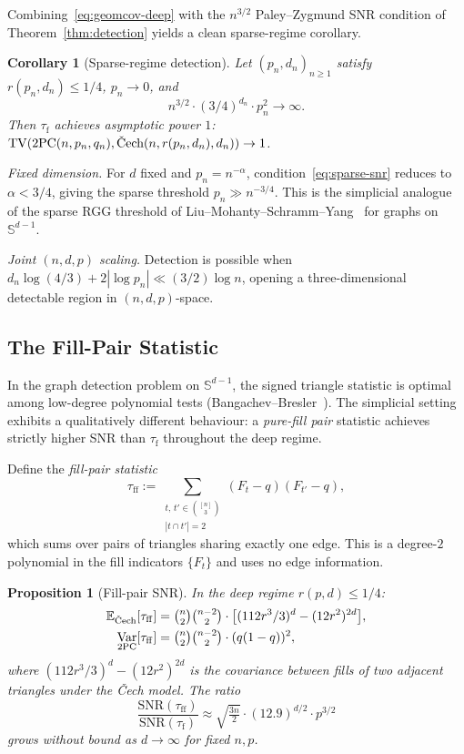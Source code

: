 \documentclass[reqno,12pt]{amsart}
\newcommand{\tauf}{\tau_{\mathrm{f}}}
\newcommand{\tauff}{\tau_{\mathrm{ff}}}
\newcommand{\PC}{\mathrm{2PC}}
\newcommand{\Cech}{\ifmmode\text{\v{C}ech}\else\v{C}ech\fi}  %
\newcommand{\TV}{\mathrm{TV}}
\newcommand{\Sph}{\mathbb{S}}
\newcommand{\EE}{\mathbb{E}}
\DeclareMathOperator{\Var}{Var}
\theoremstyle{plain}
\newtheorem{proposition}[theorem]{Proposition}
\newtheorem{corollary}[theorem]{Corollary}
\theoremstyle{definition}
\theoremstyle{remark}
\begin{document}
Combining~\eqref{eq:geomcov-deep} with the $n^{3/2}$ Paley--Zygmund SNR condition of
Theorem~\ref{thm:detection} yields a clean sparse-regime corollary.

\begin{corollary}[Sparse-regime detection]\label{cor:sparse}
Let $(p_n, d_n)_{n\geq 1}$ satisfy $r(p_n,d_n) \leq 1/4$, $p_n \to 0$, and
\begin{equation}\label{eq:sparse-snr}
  n^{3/2} \cdot (3/4)^{d_n} \cdot p_n^2 \to \infty.
\end{equation}
Then $\tauf$ achieves asymptotic power $1$: $\TV(\PC(n,p_n,q_n),\Cech(n,r(p_n,d_n),d_n))\to 1$.
\end{corollary}

\noindent
\emph{Fixed dimension.} For $d$ fixed and $p_n = n^{-\alpha}$, condition~\eqref{eq:sparse-snr}
reduces to $\alpha < 3/4$, giving the sparse threshold $p_n \gg n^{-3/4}$. This is the simplicial
analogue of the sparse RGG threshold of Liu--Mohanty--Schramm--Yang~\cite{Liu2022} for graphs on
$\Sph^{d-1}$.

\emph{Joint $(n,d,p)$ scaling.} Detection is possible when
$d_n\log(4/3) + 2|\!\log p_n| \ll (3/2)\log n$, opening a three-dimensional detectable region
in $(n,d,p)$-space.

\subsection{The Fill-Pair Statistic}\label{sec:fillfill}

In the graph detection problem on $\Sph^{d-1}$, the signed triangle statistic is optimal among
low-degree polynomial tests (Bangachev--Bresler~\cite{BangachevBresler2024}). The simplicial
setting exhibits a qualitatively different behaviour: a \emph{pure-fill pair} statistic achieves
strictly higher SNR than $\tauf$ throughout the deep regime.

Define the \emph{fill-pair statistic}
\[
  \tauff := \sum_{\substack{t,\, t' \in \binom{[n]}{3} \\ |t \cap t'| = 2}}
            (F_t - q)(F_{t'} - q),
\]
which sums over pairs of triangles sharing exactly one edge. This is a degree-$2$ polynomial
in the fill indicators $\{F_t\}$ and uses no edge information.

\begin{proposition}[Fill-pair SNR]\label{prop:fillfill}
In the deep regime $r(p,d) \leq 1/4$:
\begin{align}
  \EE_{\Cech}[\tauff] &= \tbinom{n}{2}\tbinom{n-2}{2} \cdot
    \bigl[(112r^3/3)^d - (12r^2)^{2d}\bigr], \label{eq:tauff-mean}\\
  \Var_{2\mathrm{PC}}[\tauff] &= \tbinom{n}{2}\tbinom{n-2}{2} \cdot (q(1-q))^2,
    \label{eq:tauff-var}
\end{align}
where $(112r^3/3)^d - (12r^2)^{2d}$ is the covariance between fills of two adjacent triangles
under the \v{C}ech model. The ratio
\[
  \frac{\mathrm{SNR}(\tauff)}{\mathrm{SNR}(\tauf)}
  \approx \sqrt{\tfrac{3n}{2}} \cdot (12.9)^{d/2} \cdot p^{3/2}
\]
grows without bound as $d \to \infty$ for fixed $n,p$.
\end{proposition}
\end{document}
